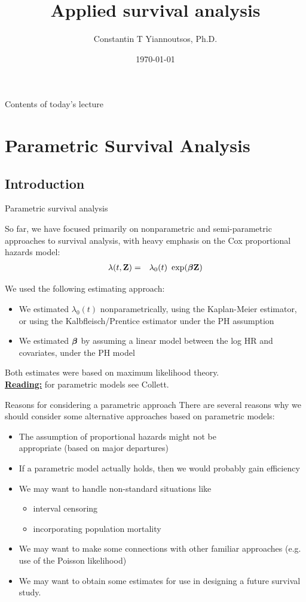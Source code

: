 \documentclass[envcountsect, 10pt, portrait, palatino]{beamer}
\title[]{Applied survival analysis}
\author[Constantin T Yiannoutsos]
{ Constantin T Yiannoutsos, Ph.D.}
\date[]{\today}
\newcommand{\bfbeta}{{\mbox{\boldmath$\beta$}}}
\newcommand{\bfZ}{{\mbox{{\bf Z}}}}
\begin{document}
\begin{frame}
  \titlepage
\end{frame}
\begin{frame}{Contents of today's lecture}
  \tableofcontents
\end{frame}
\section{ Parametric Survival Analysis}
\subsection{Introduction}
\begin{frame}{Parametric survival analysis}

So far, we have focused primarily on nonparametric and
semi-parametric approaches to survival analysis, with heavy
emphasis on the Cox proportional hazards model:
\begin{eqnarray*}
\lambda(t,\bfZ) & = & \lambda_0(t) ~ \exp(\bfbeta \bfZ)
\end{eqnarray*}

We used the following estimating approach:
\begin{itemize}
\item We estimated $\lambda_0(t)$ nonparametrically,
using the Kaplan-Meier estimator, or using the
Kalbfleisch/Prentice estimator under the PH assumption
\item We estimated $\bfbeta$ by assuming a linear model
between the log HR and covariates, under the PH model
\end{itemize}
Both estimates were based on maximum likelihood theory.
\\[2ex]
\underline{\bf Reading:} for parametric models see Collett.
\end{frame}
\begin{frame}{Reasons for considering a parametric approach}
There are several reasons why we should consider some
alternative approaches based on parametric models:

\begin{itemize}
\item  The assumption of proportional hazards might not be \\
appropriate (based on major departures)
\item  If a parametric model actually holds, then we would probably
gain efficiency
\item  We may want to handle non-standard situations like
\begin{itemize}
\item  interval censoring
\item  incorporating population mortality
\end{itemize}
\item  We may want to make some connections with other
familiar approaches
 (e.g. use of the Poisson likelihood)
\item We may want to obtain some estimates for use in designing a
future survival study.
\end{itemize}
\end{frame} 
\end{document}
